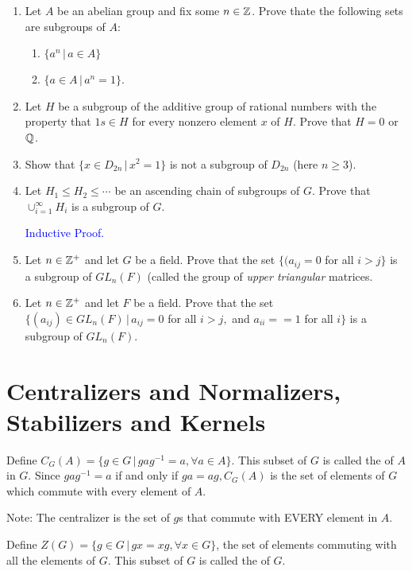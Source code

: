 \documentclass[10pt,a4paper]{report}
\newcommand{\BLUE}[1]{\textcolor{blue}{#1}}
\begin{document}
\begin{enumerate}
\item Let $A$ be an abelian group and fix some $n \in \mathbb{Z}$.  Prove thate the following sets are subgroups of $A$:
\begin{enumerate}
	\item $\{a^n\,|\, a \in A\}$
	\item $\{a \in A \,|\, a^n=1\}$.
\end{enumerate}

\item Let $H$ be a subgroup of the additive group of rational numbers with the property that $1s\in H$ for every nonzero element $x$ of $H$. Prove that $H=0$ or $\mathbb{Q}$.

\item Show that $\{x \in D_{2n}\,|\,x^2=1\}$ is not a subgroup of $D_{2n}$ (here $n \ge 3$).

\item Let $H_1 \le H_2\le \cdots$ be an ascending chain of subgroups of $G$.  Prove that $\cup_{i=1}^\infty H_i$ is a subgroup of $G$.

\BLUE{Inductive Proof.}

\item Let $n \in \mathbb{Z}^+$ and let $G$ be a field.  Prove that the set $\{(a_{ij}=0$ for all $i >j\}$ is a subgroup of $GL_n(F)$ (called the group of \textit{upper triangular} matrices.

\item Let $n \in \mathbb{Z}^+$ and let $F$ be a field.  Prove that the set $\{(a_{ij}) \in GL_n(F)\,|\, a_{ij}=0$ for all $i>j,$ and $a_{ii} ==1$ for all $i\}$ is a subgroup of $GL_n(F)$.
\end{enumerate}

\section{Centralizers and Normalizers, Stabilizers and Kernels}

\begin{definition}[Centralizer]Define $C_G(A)=\{g \in G\,|\,gag^{-1}=a, \forall a \in A\}$.  This subset of $G$ is called the  of $A$ in $G$.  Since $gag^{-1}=a$ if and only if $ga=ag, C_G(A)$ is the set of elements of $G$ which commute with every element of $A$.
\end{definition}
Note: The centralizer is the set of $g$s that commute with EVERY element in $A$.

\begin{definition}[Center]Define $Z(G) =\{g \in G\,|\,gx=xg, \forall x \in G\}$, the set of elements commuting with all the elements of $G$.  This subset of $G$ is called the  of $G$.
\end{definition}
\end{document}
